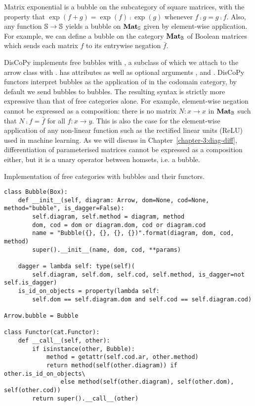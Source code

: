 \begin{example}
Matrix exponential is a bubble on the subcategory of square matrices, with the property that $\exp(f + g) = \exp(f) \fcmp \exp(g)$ whenever $f \fcmp g = g \fcmp f$.
Also, any function $\S \to \S$ yields a bubble on $\mathbf{Mat}_\S$ given by element-wise application.
For example, we can define a bubble on the category $\mathbf{Mat}_\B$ of Boolean matrices which sends each matrix $f$ to its entrywise negation $\bar{f}$.
\end{example}

DisCoPy implements free bubbles with , a subclass of  which we attach to the arrow class with .
 has attributes  as well as optional arguments ,  and .
DisCoPy functors interpret bubbles as the application of  in the codomain category, by default we send bubbles to bubbles.
The resulting syntax is strictly more expressive than that of free categories alone.
For example, element-wise negation cannot be expressed as a composition: there is no matrix $N : x \to x$ in $\mathbf{Mat}_\B$ such that $N \fcmp f = \bar{f}$ for all $f : x \to y$.
This is also the case for the element-wise application of any non-linear function such as the rectified linear units (ReLU) used in machine learning.
As we will discuss in Chapter~\ref{chapter-3:diag-diff}, differentiation of parameterised matrices cannot be expressed as a composition either, but it is a unary operator between homsets, i.e. a bubble.

\begin{python}
{\normalfont Implementation of free categories with bubbles and their functors.}

\begin{verbatim}
class Bubble(Box):
    def __init__(self, diagram: Arrow, dom=None, cod=None, method="bubble", is_dagger=False):
        self.diagram, self.method = diagram, method
        dom, cod = dom or diagram.dom, cod or diagram.cod
        name = "Bubble({}, {}, {}, {})".format(diagram, dom, cod, method)
        super().__init__(name, dom, cod, **params)

    dagger = lambda self: type(self)(
        self.diagram, self.dom, self.cod, self.method, is_dagger=not self.is_dagger)
    is_id_on_objects = property(lambda self:
        self.dom == self.diagram.dom and self.cod == self.diagram.cod)

Arrow.bubble = Bubble

class Functor(cat.Functor):
    def __call__(self, other):
        if isinstance(other, Bubble):
            method = getattr(self.cod.ar, other.method)
            return method(self(other.diagram)) if other.is_id_on_objects\
                else method(self(other.diagram), self(other.dom), self(other.cod))
        return super().__call__(other)
\end{verbatim}
\end{python}


